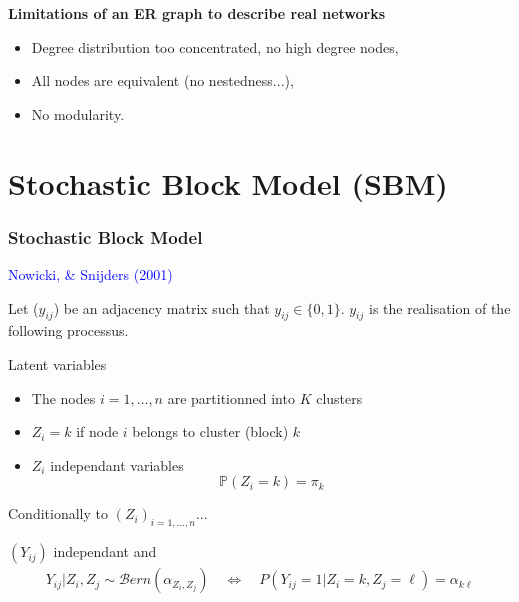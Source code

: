\documentclass[compress,10pt]{beamer}
\begin{document}
\begin{frame}
\textbf{\textcolor{dgreen}{Limitations of an ER graph to describe real networks}}
\begin{itemize}
 \item Degree distribution too concentrated, no high degree nodes,
 \item All nodes are equivalent (no nestedness...),
 \item No modularity.

 \end{itemize}
 

\end{frame}




\section{Stochastic Block Model (SBM)}

\begin{frame}  \frametitle{Stochastic Block Model}

\textcolor{blue}{Nowicki, \& Snijders (2001)}

Let ($y_{ij}$) be an adjacency matrix such that $y_{ij} \in \{0,1\}$.  $y_{ij}$ is the realisation of the following processus. 

\begin{block}{Latent variables}
\begin{itemize}
\item The nodes $i= 1,\dots,n$ are partitionned into $K$ clusters
\item $Z_i = k$ if node $i$ belongs to cluster (block) $k$
\item $Z_i$ independant variables
$$ \mathbb{P}(Z_i = k) = \pi_k$$
\end{itemize}
\end{block}

\begin{block}{Conditionally to $(Z_i)_{i=1,\dots,n}$... }

$(Y_{ij})$ independant and 
\begin{eqnarray*}
 Y_{ij}  | Z_i, Z_j \sim  \mathcal{B}ern(\alpha_{Z_i,Z_j}) \quad \Leftrightarrow \quad  P(Y_{ij} = 1 | Z_i = k, Z_j = \ell)  =  \alpha_{k\ell}
\end{eqnarray*}
\end{block}
 


\end{frame}
\end{document}

